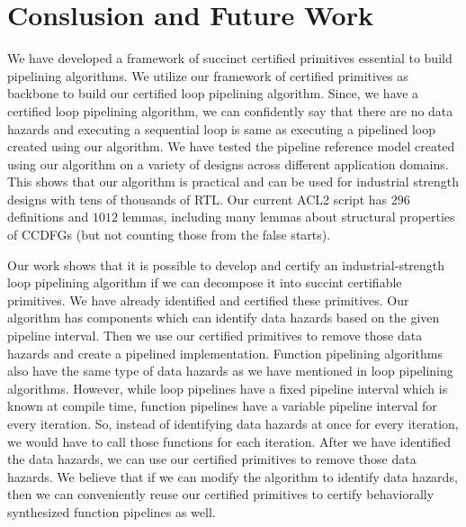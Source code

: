 \section{Conslusion and Future Work}
\label{sec:research-plan}

We have developed a framework of succinct certified primitives essential to build pipelining algorithms. We utilize our framework of certified primitives as backbone to build our certified loop pipelining algorithm. Since, we have a certified loop pipelining algorithm, we can confidently say that there are no data hazards and executing a sequential loop is same as executing a pipelined loop created using our algorithm. We have tested the pipeline reference model created using our algorithm on a variety of designs across different application domains. This shows that our algorithm is practical and can be used for industrial strength designs with tens of thousands of RTL. Our current ACL2 script has $296$ definitions and $1012$ lemmas, including many lemmas about structural properties of CCDFGs (but not counting those from the false starts). 

Our work shows that it is possible to develop and certify an industrial-strength loop pipelining algorithm if we can decompose it into succint certifiable primitives. We have already identified and certified these primitives. Our algorithm has components which can identify data hazards based on the given pipeline interval. Then we use our certified primitives to remove those data hazards and create a pipelined implementation. Function pipelining algorithms also have the same type of data hazards as we have mentioned in loop pipelining algorithms. However, while loop pipelines have a fixed pipeline interval which is known at compile time, function pipelines have a variable pipeline interval for every iteration. So, instead of identifying data hazards at once for every iteration, we would have to call those functions for each iteration. After we have identified the data hazards, we can use our certified primitives to remove those data hazards. We believe that if we can modify the algorithm to identify data hazards, then we can conveniently reuse our certified primitives to certify behaviorally synthesized function pipelines as well.     